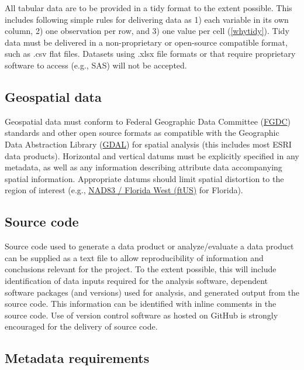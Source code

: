 \documentclass[
]{book}
\begin{document}
All tabular data are to be provided in a tidy format to the extent possible. This includes following simple rules for delivering data as 1) each variable in its own column, 2) one observation per row, and 3) one value per cell (\ref{whytidy}). Tidy data must be delivered in a non-proprietary or open-source compatible format, such as .csv flat files. Datasets using .xlsx file formats or that require proprietary software to access (e.g., SAS) will not be accepted.

\hypertarget{geospatial-data}{%
\subsection{Geospatial data}\label{geospatial-data}}

Geospatial data must conform to Federal Geographic Data Committee (\href{https://www.fgdc.gov/standards}{FGDC}) standards and other open source formats as compatible with the Geographic Data Abstraction Library (\href{https://gdal.org/}{GDAL}) for spatial analysis (this includes most ESRI data products). Horizontal and vertical datums must be explicitly specified in any metadata, as well as any information describing attribute data accompanying spatial information. Appropriate datums should limit spatial distortion to the region of interest (e.g., \href{https://epsg.io/2237-1714}{NAD83 / Florida West (ftUS)} for Florida).

\hypertarget{source-code}{%
\subsection{Source code}\label{source-code}}

Source code used to generate a data product or analyze/evaluate a data product can be supplied as a text file to allow reproducibility of information and conclusions relevant for the project. To the extent possible, this will include identification of data inputs required for the analysis software, dependent software packages (and versions) used for analysis, and generated output from the source code. This information can be identified with inline comments in the source code. Use of version control software as hosted on GitHub is strongly encouraged for the delivery of source code.

\hypertarget{metadata-requirements}{%
\subsection{Metadata requirements}\label{metadata-requirements}}
\end{document}
